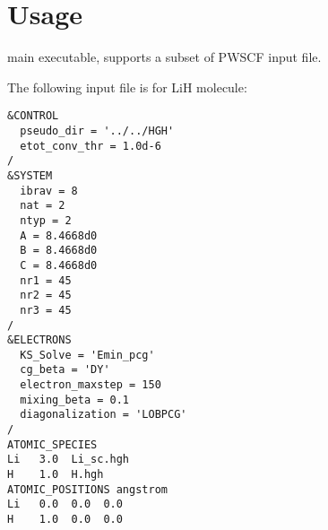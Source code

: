 \section{Usage}

\ffrLFDFT main executable, \ffrmain supports a subset of
PWSCF input file.

The following input file is for LiH molecule:
\begin{verbatim}
&CONTROL
  pseudo_dir = '../../HGH'
  etot_conv_thr = 1.0d-6
/
&SYSTEM
  ibrav = 8
  nat = 2
  ntyp = 2
  A = 8.4668d0
  B = 8.4668d0
  C = 8.4668d0
  nr1 = 45
  nr2 = 45
  nr3 = 45
/
&ELECTRONS
  KS_Solve = 'Emin_pcg'
  cg_beta = 'DY'
  electron_maxstep = 150
  mixing_beta = 0.1
  diagonalization = 'LOBPCG'
/
ATOMIC_SPECIES
Li   3.0  Li_sc.hgh
H    1.0  H.hgh
ATOMIC_POSITIONS angstrom
Li   0.0  0.0  0.0
H    1.0  0.0  0.0
\end{verbatim}


